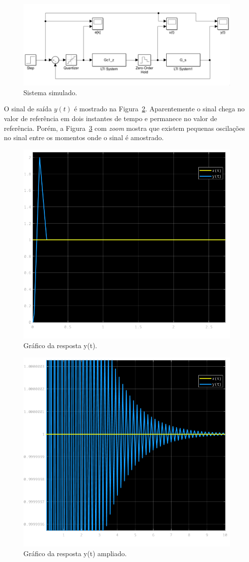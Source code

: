 \documentclass{article}
\begin{document}
        \begin{figure}[H]
           \centering
                \includegraphics[width=.7\linewidth]{images/q2_simulink.png}
                \caption{Sistema simulado.}
                \label{fig:q2_simulink}
        \end{figure}

        {O sinal de saída $y(t)$ é mostrado na Figura~\ref{fig:q2_simulink_y}.
        Aparentemente o sinal chega no valor de referência em dois instantes de
        tempo e permanece no valor de referência. Porém, a
        Figura~\ref{fig:q2_simulink_y_zoom} com \textit{zoom} mostra que existem
        pequenas oscilações no sinal entre os momentos onde o sinal é amostrado.}

        \begin{figure}[H]
           \centering
                \includegraphics[width=.6\linewidth]{images/q2_y_t.png}
                \caption{Gráfico da resposta y(t).}
                \label{fig:q2_simulink_y}
        \end{figure}

        \begin{figure}[H]
           \centering
                \includegraphics[width=.6\linewidth]{images/q2_y_t_zoom.png}
                \caption{Gráfico da resposta y(t) ampliado.}
                \label{fig:q2_simulink_y_zoom}
        \end{figure}
\end{document}
